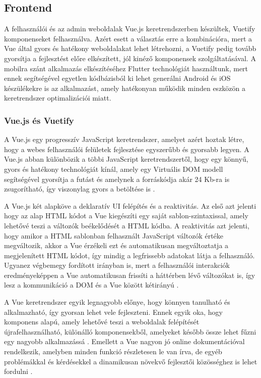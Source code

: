 \subsection{Frontend}
A felhasználói és az admin weboldalak Vue.js keretrendszerben készültek, Vuetify komponenseket felhasználva. Azért esett a választás erre a kombinációra, mert a Vue által gyors és hatékony weboldalakat lehet létrehozni, a Vuetify pedig tovább gyorsítja a fejlesztést előre elkészített, jól kinéző komponensek szolgáltatásával.
A mobilra szánt alkalmazás elkészítéséhez Flutter technológiát használtunk, mert ennek segítségével egyetlen kódbázisból ki lehet generálni Android és iOS készülékekre is az alkalmazást, amely hatékonyan működik minden eszközön a keretrendszer optimalizációi miatt.

\subsubsection{Vue.js és Vuetify}
A Vue.js egy progresszív JavaScript keretrendszer, amelyet azért hoztak létre, hogy a webes felhasználói felületek fejlesztése egyszerűbb és gyorsabb legyen. A Vue.js abban különbözik a többi JavaScript keretrendszertől, hogy egy könnyű, gyors és hatékony technológiát kínál, amely egy Virtuális DOM modell segítségével gyorsítja a futást és amelynek a forráskódja akár 24 Kb-ra is zsugorítható, így viszonylag gyors a betöltése is \cite{vueinaction}.

A Vue.js két alapköve a deklaratív UI felépítés és a reaktivitás. Az első azt jelenti hogy az alap HTML kódot a Vue kiegészíti egy saját sablon-szintaxissal, amely lehetővé teszi a változók beékelődését a HTML kódba. A reaktivitás azt jelenti, hogy amikor a HTML sablonban felhasznált JavaScript változók értéke megváltozik, akkor a Vue érzékeli ezt és automatikusan megváltoztatja a megjelenített HTML kódot, így mindig a legfrissebb adatokat látja a felhasználó. Ugyanez végbemegy fordított irányban is, mert a felhasználói interakciók eredményeképpen a Vue automatikusan frissíti a háttérben lévő változókat is, így lesz a kommunikáció a DOM és a Vue között kétirányú \cite{vueinaction,vue3}.

A Vue keretrendszer egyik legnagyobb előnye, hogy könnyen tanulható és alkalmazható, így gyorsan lehet vele fejleszteni. Ennek egyik oka, hogy komponens alapú, amely lehetővé teszi a weboldalak felépítését újrafelhasználható, különálló komponensekből, amelyeket később össze lehet fűzni egy nagyobb alkalmazássá \cite{vue3}. Emellett a Vue nagyon jó online dokumentációval rendelkezik, amelyben minden funkció részletesen le van írva, de egyéb problémákkal és kérdésekkel a dinamikusan növekvő fejlesztői közösséghez is lehet fordulni \cite{vueinaction}.

